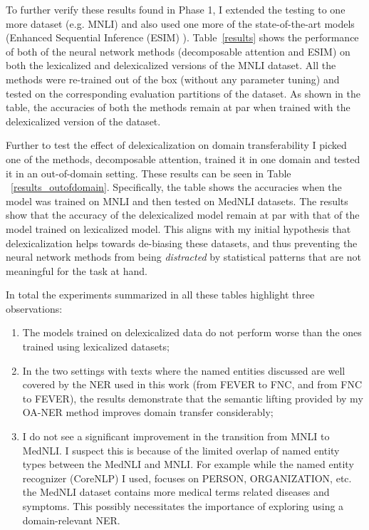 \documentclass{article}
\begin{document}
To further verify these results found in Phase 1, I extended the testing to one more dataset (e.g. MNLI) and also used one more of the state-of-the-art models (Enhanced Sequential Inference (ESIM)  \cite{chen2016enhanced}). Table~\ref{results} shows the performance of both of the neural network methods (decomposable attention and ESIM) on  both the lexicalized and delexicalized versions of the MNLI dataset. All the methods were re-trained out of the box (without any parameter tuning) and tested on the corresponding evaluation partitions of the dataset. As shown in the table, the accuracies of both the methods remain at par when trained with the delexicalized version of the dataset. 


 
Further to test the effect of delexicalization on domain transferability I picked one of the methods, decomposable attention, trained it in one domain and tested it in an out-of-domain setting. These results can be seen in Table ~\ref{results_outofdomain}. Specifically, the table shows the accuracies when the model was trained on MNLI and then tested on MedNLI datasets. The results show that the accuracy of the delexicalized model remain at par with that of the model trained on lexicalized model. This aligns with my initial hypothesis that delexicalization helps towards de-biasing these datasets, and thus preventing the neural network methods from being \textit{distracted} by statistical patterns that are not meaningful for the task at hand.

In total the experiments summarized in all these tables highlight three observations: 

\begin {enumerate}
\item The models trained on delexicalized data do not perform worse than the ones trained using lexicalized datasets; 
\item In the two settings with texts where the named entities discussed are well covered by the NER used in this work (from FEVER to FNC, and from FNC to FEVER), the results demonstrate that the semantic lifting provided by my OA-NER method improves domain transfer considerably;  

\item I do not see a significant improvement in the transition from MNLI to MedNLI.  I suspect this is because of the limited overlap of named entity types between the MedNLI and MNLI. For example while the named entity recognizer (CoreNLP) I used, focuses on PERSON, ORGANIZATION, etc. the MedNLI dataset contains more medical terms related diseases and symptoms. This possibly necessitates the importance of exploring using a domain-relevant NER.

\end {enumerate}
\end{document}
